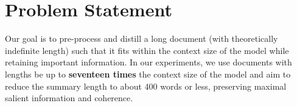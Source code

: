 \section{Problem Statement}
\label{sec:problem}

Our goal is to pre-process and distill a long document (with theoretically indefinite length) such that it fits within the context size of the model while retaining important information.
In our experiments, we use documents with lengths be up to \textbf{seventeen times} the context size of the model and aim to reduce the summary length to about 400 words or less, preserving maximal salient information and coherence.
